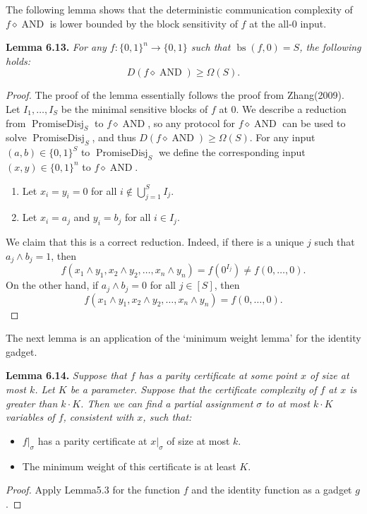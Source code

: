 \documentclass[10pt,a4paper]{article}
\newcommand{\bits}{\{0,1\}}
\newcommand{\comp}{\diamond}
\newcommand{\AND}{\operatorname{AND}}
\newenvironment{originalresult}[1]{\par\medskip\noindent\textbf{#1.}\itshape}{\par\medskip}
\begin{document}
The following lemma shows that the deterministic communication complexity of $f\comp\AND$ is lower bounded by the block sensitivity of $f$ at the all-0 input.
\begin{originalresult}{Lemma 6.13}
For any $f:\bits^n\to\bits$ such that $\operatorname{bs}(f,0)=S$, the following holds:
\[D(f\comp\AND)\ge\Omega(S).\]
\end{originalresult}
\begin{proof}
The proof of the lemma essentially follows the proof from Zhang(2009). Let $I_1,\ldots,I_S$ be the minimal sensitive blocks of $f$ at 0. We describe a reduction from $\operatorname{PromiseDisj}_S$ to $f\comp\AND$, so any protocol for $f\comp\AND$ can be used to solve $\operatorname{PromiseDisj}_S$, and thus $D(f\comp\AND)\ge\Omega(S)$. For any input $(a,b)\in\bits^S$ to $\operatorname{PromiseDisj}_S$ we define the corresponding input $(x,y)\in\bits^n$ to $f\comp\AND$.
\begin{enumerate}
\item Let $x_i=y_i=0$ for all $i\notin\bigcup_{j=1}^S I_j$.
\item Let $x_i=a_j$ and $y_i=b_j$ for all $i\in I_j$.
\end{enumerate}
We claim that this is a correct reduction. Indeed, if there is a unique $j$ such that $a_j\wedge b_j=1$, then
\[f(x_1\wedge y_1,x_2\wedge y_2,\ldots,x_n\wedge y_n)=f(0^{I_j})\ne f(0,\ldots,0).\]
On the other hand, if $a_j\wedge b_j=0$ for all $j\in[S]$, then
\[f(x_1\wedge y_1,x_2\wedge y_2,\ldots,x_n\wedge y_n)=f(0,\ldots,0).\]
\end{proof}
The next lemma is an application of the `minimum weight lemma' for the identity gadget.
\begin{originalresult}{Lemma 6.14}
Suppose that $f$ has a parity certificate at some point $x$ of size at most $k$. Let $K$ be a parameter. Suppose that the certificate complexity of $f$ at $x$ is greater than $k\cdot K$. Then we can find a partial assignment $\sigma$ to at most $k\cdot K$ variables of $f$, consistent with $x$, such that:
\begin{itemize}
\item $f|_\sigma$ has a parity certificate at $x|_\sigma$ of size at most $k$.
\item The minimum weight of this certificate is at least $K$.
\end{itemize}
\end{originalresult}
\begin{proof}
Apply Lemma5.3 for the function $f$ and the identity function as a gadget $g$.
\end{proof}
\end{document}
